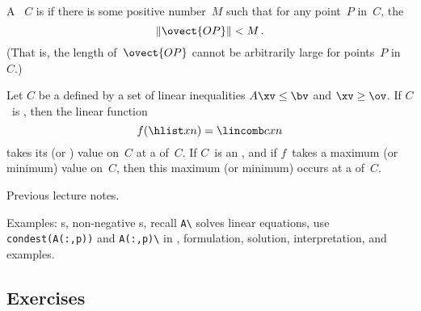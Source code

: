 \begin{definition}
A ~$C$ is  if there is some positive number~$M$ such that for any point~$P$ in~$C$, the 
\[
\|\ovect{OP}\|<M\,.
\]
(That is, the length of~$\ovect{OP}$ cannot be arbitrarily large
for points~$P$ in~$C$.)
\end{definition}

\begin{theorem}\label{convex}
Let $C$ be a  
defined by a set of linear inequalities $A\xv\le \bv$ and $\xv\ge \ov$.
If $C$~is , then the linear function 
\[
f(\hlist xn)=\lincomb cxn
\]
takes its  (or ) value on~$C$ at a  of~$C$. If $C$~is an  , and if $f$~takes a maximum (or minimum) value on~$C$, then this maximum (or minimum) occurs at a  of~$C$.
\end{theorem}

\begin{prof} Previous lecture notes.
\end{prof}

\begin{remark} 
Examples: s, non-negative s, recall \verb|A\| solves linear equations, use \verb|condest(A(:,p))| and \verb|A(:,p)\| in \script, formulation, solution, interpretation, and examples.
\end{remark}


\subsection{Exercises}


